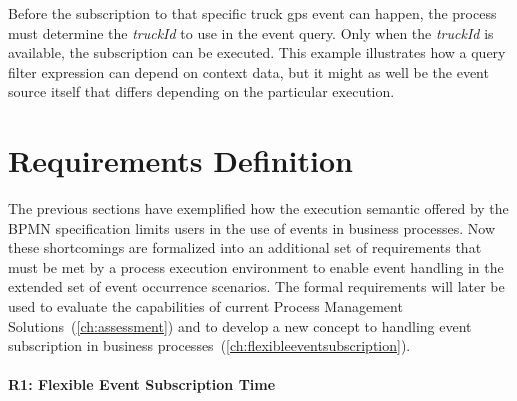 
Before the subscription to that specific truck gps event can happen, the process must determine the \textit{truckId} to use in the event query. Only when the \textit{truckId} is available, the subscription can be executed. This example illustrates how a query filter expression can depend on context data, but it might as well be the event source itself that differs depending on the particular execution.




\section{Requirements Definition}

The previous sections have exemplified how the execution semantic offered by the BPMN specification limits users in the use of events in business processes. Now these shortcomings are formalized into an additional set of requirements that must be met by a process execution environment to enable event handling in the extended set of event occurrence scenarios.
The formal requirements will later be used to evaluate the capabilities of current Process Management Solutions~(\autoref{ch:assessment}) and to develop a new concept to handling event subscription in business processes~(\autoref{ch:flexibleeventsubscription}).

\paragraph{R1: Flexible Event Subscription Time}

